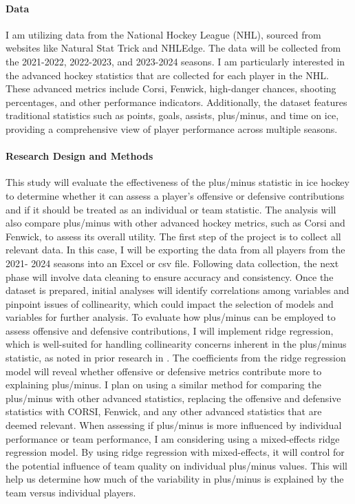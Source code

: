 \documentclass[12pt]{article}
\begin{document}
\paragraph{Data}

I am utilizing data from the National Hockey League (NHL), sourced from websites like Natural Stat Trick and NHLEdge.
The data will be collected from the 2021-2022, 2022-2023, and 2023-2024 seasons. I am particularly interested in the advanced hockey 
statistics that are collected for each player in the NHL. These advanced metrics include Corsi, Fenwick, high-danger chances, shooting 
percentages, and other performance indicators. Additionally, the dataset features traditional statistics such as points, 
goals, assists, plus/minus, and time on ice, providing a comprehensive view of player performance across multiple seasons.



\paragraph{Research Design and Methods}
This study will evaluate the effectiveness of the plus/minus statistic in ice hockey to determine whether it can assess a 
player's offensive or defensive contributions and if it should be treated as an individual or team statistic. The analysis 
will also compare plus/minus with other advanced hockey metrics, such as Corsi and Fenwick, to assess its overall utility.
The first step of the project is to collect all relevant data. In this case, I will be exporting the data from all players
from the 2021- 2024 seasons into an Excel or csv file.  Following data collection, the next phase will involve data cleaning to 
ensure accuracy and consistency. Once the dataset is prepared, initial analyses will identify correlations among variables 
and pinpoint issues of collinearity, which could impact the selection of models and variables for further analysis.
To evaluate how plus/minus can be employed to assess offensive and defensive contributions, I will implement ridge regression, 
which is well-suited for handling collinearity concerns inherent in the plus/minus statistic, as 
noted in prior research in \cite{Macdonald_2012}. The coefficients from the ridge regression model will reveal 
whether offensive or defensive metrics contribute more to explaining plus/minus. I plan on using a similar method for comparing
the plus/minus with other advanced statistics, replacing the offensive and defensive statistics with CORSI, Fenwick, and any other
advanced statistics that are deemed relevant. When assessing if plus/minus is more influenced by individual performance or team 
performance, I am considering using a mixed-effects ridge regression model. By using ridge regression with mixed-effects, it will 
control for the potential influence of team quality on individual plus/minus values. This will help us determine how much of the 
variability in plus/minus is explained by the team versus individual players.
\end{document}
